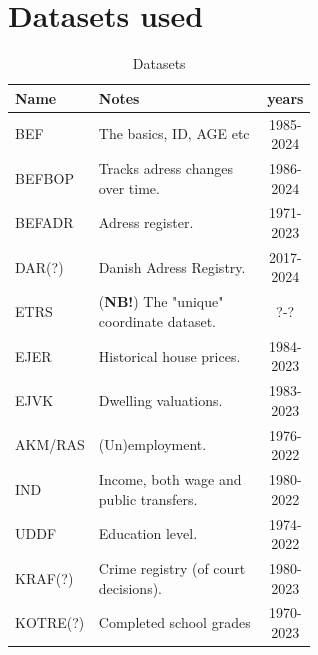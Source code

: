 \documentclass[../main.tex]{subfiles}
\begin{document}
\section{Datasets used}
\begin{table}[H]
    \centering
    \caption{Datasets}
    \begin{tabular}{l|p{0.6\linewidth}|c}
    \toprule
      Name & Notes & years \\
    \midrule
      BEF           & The basics, ID, AGE etc               & 1985-2024 \\
      BEFBOP        & Tracks adress changes over time. & 1986-2024 \\
      BEFADR        & Adress register. & 1971-2023 \\
      DAR(?)        & Danish Adress Registry. & 2017-2024 \\ 
      ETRS & (\textbf{NB!}) The "unique" coordinate dataset. & ?-?\\
      EJER & Historical house prices. & 1984-2023 \\
      EJVK & Dwelling valuations. & 1983-2023 \\
      AKM/RAS & (Un)employment. & 1976-2022 \\
      IND & Income, both wage and public transfers. & 1980-2022 \\
      UDDF & Education level. & 1974-2022 \\
      \hdashline
      KRAF(?)       & Crime registry (of court decisions). & 1980-2023\\
      KOTRE(?)      & Completed school grades               & 1970-2023 \\
    \bottomrule
    \end{tabular}
\end{table}
\end{document}

